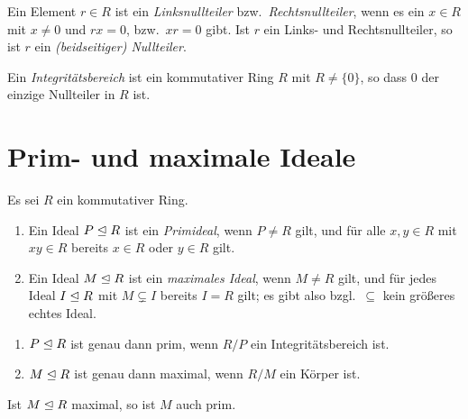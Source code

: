 \begin{definition}
  Ein Element $r \in R$ ist ein \emph{Linksnullteiler} bzw.\ \emph{Rechtsnullteiler}, wenn es ein $x \in R$ mit $x \neq 0$ und $rx = 0$, bzw.\ $xr = 0$ gibt.
  Ist $r$ ein Links- und Rechtsnullteiler, so ist $r$ ein \emph{\textup(beidseitiger\textup) Nullteiler}.
\end{definition}

\begin{definition}
  Ein \emph{Integritätsbereich} ist ein kommutativer Ring $R$ mit $R \neq \{0\}$, so dass $0$ der einzige Nullteiler in $R$ ist.
\end{definition}





\section{Prim- und maximale Ideale}

Es sei $R$ ein kommutativer Ring.

\begin{definition}
  \begin{enumerate}
    \item
      Ein Ideal $P \mathrel{\trianglelefteq} R$ ist ein \emph{Primideal}, wenn $P \neq R$ gilt, und für alle $x,y \in R$ mit $xy \in R$ bereits $x \in R$ oder $y \in R$ gilt.
    \item
      Ein Ideal $M \mathrel{\trianglelefteq} R$ ist ein \emph{maximales Ideal}, wenn $M \neq R$ gilt, und für jedes Ideal $I \mathrel{\trianglelefteq} R$ mit $M \subsetneq I$ bereits $I = R$ gilt;
      es gibt also bzgl.\ $\subseteq$ kein größeres echtes Ideal.
  \end{enumerate}
\end{definition}

\begin{lemma}
  \begin{enumerate}
    \item
      $P \mathrel{\trianglelefteq} R$ ist genau dann prim, wenn $R/P$ ein Integritätsbereich ist.
    \item
      $M \mathrel{\trianglelefteq} R$ ist genau dann maximal, wenn $R/M$ ein Körper ist.
  \end{enumerate}
\end{lemma}

\begin{corollary}
  Ist $M \mathrel{\trianglelefteq} R$ maximal, so ist $M$ auch prim.
\end{corollary}


